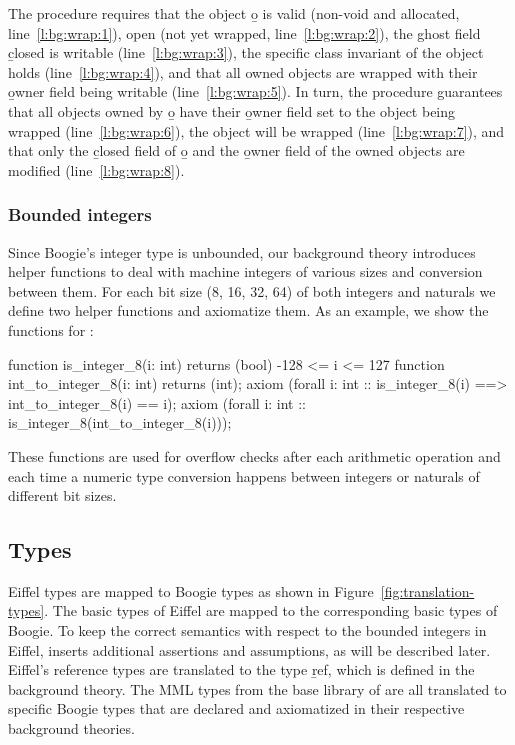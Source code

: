 The procedure requires that the object \b{o} is valid (non-void and allocated, line~\ref{l:bg:wrap:1}), open (not yet wrapped, line~\ref{l:bg:wrap:2}), the ghost field \b{closed} is writable (line~\ref{l:bg:wrap:3}), the specific class invariant of the object holds (line~\ref{l:bg:wrap:4}), and that all owned objects are wrapped with their \b{owner} field being writable (line~\ref{l:bg:wrap:5}). In turn, the procedure guarantees that all objects owned by \b{o} have their \b{owner} field set to the object being wrapped (line~\ref{l:bg:wrap:6}), the object will be wrapped (line~\ref{l:bg:wrap:7}), and that only the \b{closed} field of \b{o} and the \b{owner} field of the owned objects are modified (line~\ref{l:bg:wrap:8}).



\subsubsection{Bounded integers}

Since Boogie's integer type is unbounded, our background theory introduces helper functions to deal with machine integers of various sizes and conversion between them. For each bit size (8, 16, 32, 64) of both integers and naturals we define two helper functions and axiomatize them. As an example, we show the functions for :
\begin{brunning}
function is_integer_8(i: int) returns (bool) { -128 <= i <= 127 }
function int_to_integer_8(i: int) returns (int);
axiom (forall i: int :: is_integer_8(i) ==> int_to_integer_8(i) == i);
axiom (forall i: int :: is_integer_8(int_to_integer_8(i)));
\end{brunning}
These functions are used for overflow checks after each arithmetic operation and each time a numeric type conversion happens between integers or naturals of different bit sizes.


\subsection{Types}

Eiffel types are mapped to Boogie types as shown in Figure~\ref{fig:translation-types}.
The basic types of Eiffel are mapped to the corresponding basic types of Boogie.
To keep the correct semantics with respect to the bounded integers in Eiffel, \AutoProof inserts additional assertions and assumptions, as will be described later.
Eiffel's reference types are translated to the type \b{ref}, which is defined in the background theory.
The MML types from the base library of \EVE are all translated to specific Boogie types that are declared and axiomatized in their respective background theories.

